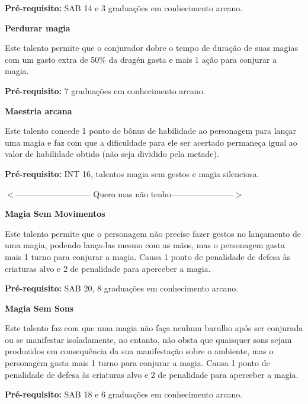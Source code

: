 \textbf{Pré-requisito:} SAB 14 e 3 graduações em conhecimento arcano.
\bigskip

\textbf{Perdurar magia}

Este talento permite que o conjurador dobre o tempo de duração de suas magias com um gasto extra de 50\% da dragén gasta e mais 1 ação para conjurar a magia.

\textbf{Pré-requisito:} 7 graduações em conhecimento arcano.
\bigskip

\textbf{Maestria arcana}

Este talento concede 1 ponto de bônus de habilidade ao personagem para lançar uma magia e faz com que a dificuldade para ele ser acertado permaneça igual ao valor de habilidade obtido (não seja dividido pela metade).

\textbf{Pré-requisito:} INT 16, talentos magia sem gestos e magia silenciosa.
\bigskip

$<$--------------------------- Quero mas não tenho-----------------------$>$

\textbf{Magia Sem Movimentos}

Este talento permite que o personagem não precise fazer gestos no lançamento de uma magia, podendo lança-las mesmo com as mãos, mas o personagem gasta mais 1 turno para conjurar a magia. Causa 1 ponto de penalidade de defesa às criaturas alvo e 2 de penalidade para aperceber a magia.

\textbf{Pré-requisito:} SAB 20, 8 graduações em conhecimento arcano.
\bigskip

\textbf{Magia Sem Sons}

Este talento faz com que uma magia não faça nenhum barulho após ser conjurada ou se manifestar isoladamente, no entanto, não obsta que quaisquer sons sejam produzidos em consequência da sua manifestação sobre o ambiente, mas o personagem gasta mais 1 turno para conjurar a magia. Causa 1 ponto de penalidade de defesa às criaturas alvo e 2 de penalidade para aperceber a magia.

\textbf{Pré-requisito:} SAB 18 e 6 graduações em conhecimento arcano.
\bigskip